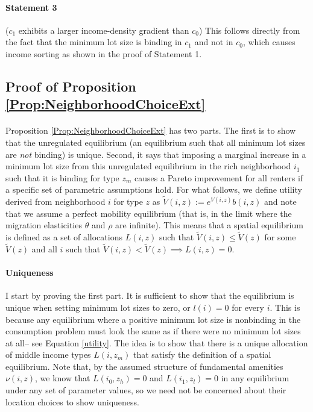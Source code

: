 \documentclass[11pt]{article}
\begin{document}
	
	\paragraph*{Statement 3} ($c_{1}$ exhibits a larger income-density gradient than $c_{0}$) This follows directly from the fact that the minimum lot size is binding in $c_{1}$ and not in $c_{0}$, which causes income sorting as shown in the proof of  Statement 1. 
	
	\subsection{Proof of Proposition \ref{Prop:NeighborhoodChoiceExt}}\label{Proof:NeighborhoodChoiceExt}
	\paragraph*{}
	Proposition \ref{Prop:NeighborhoodChoiceExt} has two parts. The first is to show that the unregulated equilibrium (an equilibrium such that all minimum lot sizes are \textit{not} binding) is unique. Second, it says that imposing a marginal increase in a minimum lot size from this unregulated equilibrium in the rich neighborhood $i_{1}$ such that it is binding for type $z_{m}$ causes a Pareto improvement for all renters if a specific set of parametric assumptions hold. For what follows, we define utility derived from neighborhood $i$ for type $z$ as $\tilde{V}(i, z) := e^{V(i, z)}b(i, z)$ and note that we assume a perfect mobility equilibrium (that is, in the limit where the migration elasticities $\theta$ and $\rho$ are infinite). This means that a spatial equilibrium is defined as a set of allocations $L(i, z)$ such that $\tilde{V}(i, z) \leq \tilde{V}(z)$ for some $\tilde{V}(z)$ and all $i$ such that $\tilde{V}(i, z) < \tilde{V}(z) \implies L(i, z) = 0$. 
	
	\paragraph*{Uniqueness}
	I start by proving the first part. It is sufficient to show that the equilibrium is unique when setting minimum lot sizes to zero, or $l(i) = 0$ for every $i$. This is because any equilibrium where a positive minimum lot size is nonbinding in the consumption problem must look the same as if there were no minimum lot sizes at all-- see Equation \eqref{utility}. The idea is to show that there is a unique allocation of middle income types $L(i, z_{m})$ that satisfy the definition of a spatial equilibrium. Note that, by the assumed structure of fundamental amenities $\nu(i, z)$, we know that $L(i_{0}, z_{h}) = 0$ and $L(i_{1}, z_{l}) = 0$ in any equilibrium under any set of parameter values, so we need not be concerned about their location choices to show uniqueness. 
	
\end{document}
